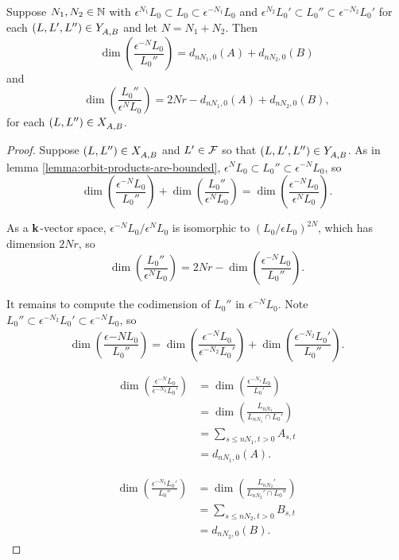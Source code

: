\documentclass[a4paper, 11pt]{report}
\begin{document}
\begin{lemma}\label{lemma:codimensions-in-orbit-product}
Suppose $N_1,N_2\in\mathbb{N}$ with $\epsilon^{N_1}L_0\subset L_0\subset \epsilon^{-N_1}L_0$ and $\epsilon^{N_2}L_0'\subset L_0''\subset \epsilon^{-N_2}L_0'$ for each $(L,L',L'')\in Y_{A,B}^{}$ and let $N = N_1 + N_2$. Then
\begin{equation*}
\dim\left(\frac{\epsilon^{-N}L_0}{L_0''}\right) = d_{nN_1,0}(A) + d_{nN_2,0}(B)
\end{equation*}
and
\begin{equation*}
\dim\left(\frac{L_0''}{\epsilon^N L_0}\right) = 2Nr - d_{nN_1,0}(A) + d_{nN_2,0}(B),
\end{equation*}
for each $(L,L'')\in X_{A,B}^{}$.
\end{lemma}

\begin{proof}
Suppose $(L,L'')\in X_{A,B}^{}$ and $L'\in\mathcal{F}$ so that $(L,L',L'')\in Y_{A,B}^{}$. As in lemma \ref{lemma:orbit-products-are-bounded}, $\epsilon^N L_0\subset L_0''\subset \epsilon^{-N}L_0$, so
\begin{equation*}
\dim\left(\frac{\epsilon^{-N}L_0}{L_0''}\right) + \dim\left(\frac{L_0''}{\epsilon^N L_0}\right) = \dim\left(\frac{\epsilon^{-N}L_0}{\epsilon^N L_0}\right).
\end{equation*}

As a $\mathbf{k}$-vector space, $\epsilon^{-N}L_0/\epsilon^N L_0$ is isomorphic to $(L_0/{\epsilon L_0})^{2N}$, which has dimension $2Nr$, so
\begin{equation*}
\dim\left(\frac{L_0''}{\epsilon^N L_0}\right) = 2Nr - \dim\left(\frac{\epsilon^{-N}L_0}{L_0''}\right).
\end{equation*}

It remains to compute the codimension of $L_0''$ in $\epsilon^{-N}L_0$. Note $L_0''\subset \epsilon^{-N_2}L_0'\subset \epsilon^{-N} L_0$, so
\begin{equation*}
\dim\left(\frac{\epsilon{-N}L_0}{L_0''}\right) = \dim\left(\frac{\epsilon^{-N}L_0}{\epsilon^{-N_2}L_0'}\right) + \dim\left(\frac{\epsilon^{-N_2}L_0'}{L_0''}\right).
\end{equation*}

\begin{align*}
\dim\left(\frac{\epsilon^{-N}L_0}{\epsilon^{-N_2}L_0'}\right)
&= \dim\left(\frac{\epsilon^{-N_1}L_0}{L_0'}\right)\\
&= \dim\left(\frac{L_{nN_1}}{L_{nN_1}\cap L_0'}\right)\\
&= \sum_{s\le nN_1, t>0} A_{s,t}\\
&= d_{nN_1,0}(A).
\end{align*}

\begin{align*}
\dim\left(\frac{\epsilon^{-N_2}L_0'}{L_0''}\right)
&= \dim\left(\frac{ L_{nN_2}'}{L_{nN_2}'\cap L_0''}\right)\\
&= \sum_{s\le nN_2, t>0} B_{s,t}\\
&= d_{nN_2,0}(B).
\end{align*}
\end{proof}
\end{document}
